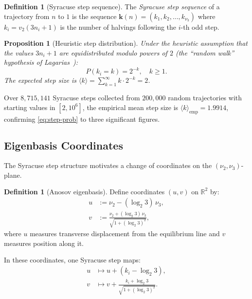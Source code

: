 \documentclass[11pt,a4paper]{article}
\newcommand{\R}{\mathbb{R}}
\theoremstyle{plain}
\newtheorem{proposition}[theorem]{Proposition}
\theoremstyle{definition}
\newtheorem{definition}[theorem]{Definition}
\begin{document}
\begin{definition}[Syracuse step sequence]
    The \emph{Syracuse step sequence} of a trajectory from $n$ to $1$ is the sequence $\mathbf{k}(n) = (k_1, k_2, \ldots, k_{\nu_3})$ where $k_i = v_2(3n_i + 1)$ is the number of halvings following the $i$-th odd step.
\end{definition}

\begin{proposition}[Heuristic step distribution]\label{prop:step-dist}
    Under the heuristic assumption that the values $3n_i + 1$ are equidistributed modulo powers of $2$ (the ``random walk'' hypothesis of Lagarias~\cite{Lagarias1985}):
    \begin{equation}\label{eq:step-prob}
        P(k_i = k) = 2^{-k}, \quad k \geq 1.
    \end{equation}
    The expected step size is $\langle k \rangle = \sum_{k=1}^{\infty} k \cdot 2^{-k} = 2$.
\end{proposition}

\begin{empirical}[Verification]
    Over $8{,}715{,}141$ Syracuse steps collected from $200{,}000$ random trajectories with starting values in $[2, 10^6]$, the empirical mean step size is $\langle k \rangle_{\mathrm{emp}} = 1.9914$, confirming \eqref{eq:step-prob} to three significant figures.
\end{empirical}


\subsection{Eigenbasis Coordinates}

The Syracuse step structure motivates a change of coordinates on the $(\nu_2, \nu_3)$-plane.

\begin{definition}[Anosov eigenbasis]\label{def:eigenbasis}
    Define coordinates $(u, v)$ on $\R^2$ by:
    \begin{align}
        u &:= \nu_2 - (\log_2 3)\,\nu_3, \label{eq:u-coord}\\
        v &:= \frac{\nu_2 + (\log_2 3)\,\nu_3}{\sqrt{1 + (\log_2 3)^2}}, \label{eq:v-coord}
    \end{align}
    where $u$ measures transverse displacement from the equilibrium line and $v$ measures position along it.
\end{definition}

In these coordinates, one Syracuse step maps:
\begin{align}
    u &\mapsto u + (k_i - \log_2 3), \label{eq:u-step}\\
    v &\mapsto v + \frac{k_i + \log_2 3}{\sqrt{1 + (\log_2 3)^2}}. \label{eq:v-step}
\end{align}
\end{document}
